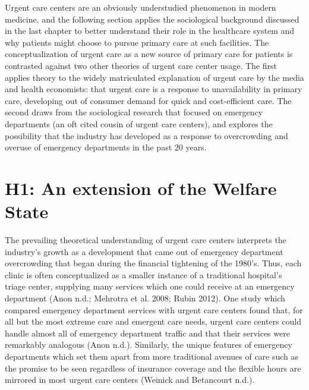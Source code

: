 \documentclass[12pt,twoside]{reedthesis}
\begin{document}
  \setcounter{chapter}{3} \setcounter{section}{0} \doublespacing
  
  Urgent care centers are an obviously understudied phenomenon in modern
  medicine, and the following section applies the sociological background
  discussed in the last chapter to better understand their role in the
  healthcare system and why patients might choose to pursue primary care
  at such facilities. The conceptualization of urgent care as a new source
  of primary care for patients is contrasted against two other theories of
  urgent care center usage. The first applies theory to the widely
  matriculated explanation of urgent care by the media and health
  economists: that urgent care is a response to unavailability in primary
  care, developing out of consumer demand for quick and cost-efficient
  care. The second draws from the sociological research that focused on
  emergency departments (an oft cited cousin of urgent care centers), and
  explores the possibility that the industry has developed as a response
  to overcrowding and overuse of emergency departments in the past 20
  years.
  
  \section*{H1: An extension of the Welfare
  State}\label{h1-an-extension-of-the-welfare-state}
  
  The prevailing theoretical understanding of urgent care centers
  interprets the industry's growth as a development that came out of
  emergency department overcrowding that began during the financial
  tightening of the 1980's. Thus, each clinic is often conceptualized as a
  smaller instance of a traditional hospital's triage center, supplying
  many services which one could receive at an emergency department (Anon
  n.d.; Mehrotra et al. 2008; Rubin 2012). One study which compared
  emergency department services with urgent care centers found that, for
  all but the most extreme care and emergent care needs, urgent care
  centers could handle almost all of emergency department traffic and that
  their services were remarkably analogous (Anon n.d.). Similarly, the
  unique features of emergency departments which set them apart from more
  traditional avenues of care such as the promise to be seen regardless of
  insurance coverage and the flexible hours are mirrored in most urgent
  care centers (Weinick and Betancourt n.d.).
  
\end{document}
